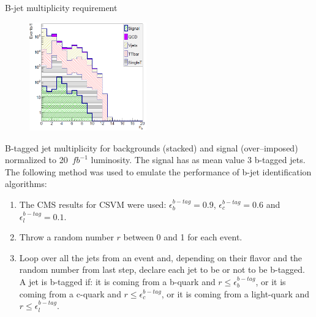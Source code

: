 \begin{frame}{B-jet multiplicity requirement}
\vspace{-.2cm}
\begin{figure}[!Hhtbp]
  \begin{center}
    \includegraphics[width=0.45\textwidth]{../figs/Pheno/Nb.png}
  \end{center}
\end{figure}

\vspace{-.2cm}
    \begin{block}{}
      \tiny B-tagged jet multiplicity for backgrounds (stacked) and signal (over--imposed) normalized to 20~$fb^{-1}$ luminosity. The signal has as mean value 3 b-tagged jets. The following method was used to emulate the performance of b-jet identification algorithms:
  \begin{enumerate}\tiny
  \item The CMS results for CSVM were used: $\epsilon^{b-tag}_{b}=0.9$, $\epsilon^{b-tag}_{c}=0.6$ and $\epsilon^{b-tag}_{l}=0.1$.
  \item Throw a random number $r$ between 0 and 1 for each event.
  \item Loop over all the jets from an event and, depending on their flavor and the random number from last step, declare each jet to be or not to be b-tagged. A jet is b-tagged if: it is coming from a b-quark and $r\leq\epsilon^{b-tag}_{b}$, or it is coming from a c-quark and $r\leq\epsilon^{b-tag}_{c}$, or it is coming from a light-quark and $r\leq\epsilon^{b-tag}_{l}$.
  \end{enumerate}
    \end{block}

\end{frame}

